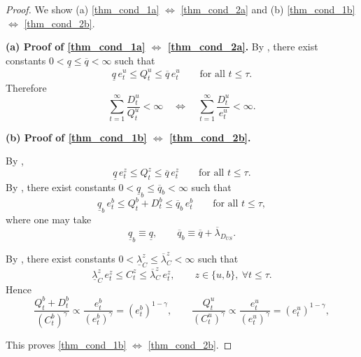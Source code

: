 \documentclass[12pt]{article}
\theoremstyle{plain}
\begin{document}
\begin{proof}
We show (a) \eqref{thm_cond_1a} $\Longleftrightarrow$ \eqref{thm_cond_2a} and
(b) \eqref{thm_cond_1b} $\Longleftrightarrow$ \eqref{thm_cond_2b}. 

\medskip
\noindent\textbf{(a) Proof of \eqref{thm_cond_1a} $\Longleftrightarrow$ \eqref{thm_cond_2a}.}
By , there exist constants $0<\underline q\le \overline q<\infty$ such that
\[
\underline q\,e_{t}^u\le Q_{t}^u\le \overline q\,e_{t}^u
\qquad\text{for all }t\le\tau.
\]
Therefore
\[
\sum_{t=1}^\infty \frac{D_t^u}{Q_t^u}<\infty
\quad\Longleftrightarrow\quad
\sum_{t=1}^\infty \frac{D_t^u}{e_{t}^u}<\infty.
\]

\medskip
\noindent\textbf{(b) Proof of \eqref{thm_cond_1b} $\Longleftrightarrow$ \eqref{thm_cond_2b}.}

By ,
\[
\underline q\,e_{t}^z\le Q_t^z\le \overline q\,e_{t}^z
\qquad\text{for all }t\le\tau.
\]
By , there exist constants $0<\underline q_b\le \overline q_b<\infty$ such that
\[
\underline q_b\,e_{t}^b
\le
Q_t^b+D_t^b
\le
\overline q_b\,e_{t}^b
\qquad\text{for all }t\le\tau,
\]
where one may take
\[
\underline q_b\equiv \underline q,
\qquad
\overline q_b\equiv \overline q+\overline\lambda_{D_{US}}.
\]

By
, there exist constants
$0<\underline\lambda^z_C\le \overline\lambda^z_C<\infty$ such that
\[
\underline\lambda^z_C\,e_{t}^z
\le
C_t^z
\le
\overline\lambda^z_C\,e_{t}^z,
\qquad
z\in\{u,b\},\ \forall t\le\tau.
\]
Hence
\[
\frac{Q^b_t+D^b_t}{(C^b_t)^\gamma} 
\propto \frac{e^b_t}{(e^b_t)^\gamma}= (e^b_t)^{1-\gamma},
\qquad
\frac{Q^u_t}{(C^u_t)^\gamma} 
\propto \frac{e^u_t}{(e^u_t)^\gamma}= (e^u_t)^{1-\gamma},
\]

This proves \eqref{thm_cond_1b} $\Longleftrightarrow$ \eqref{thm_cond_2b}.
\end{proof}



\appendix


 
\end{document}
